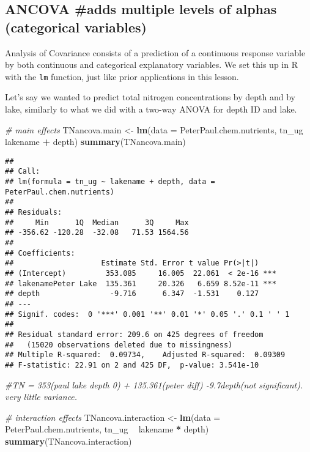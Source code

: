 \documentclass[]{article}
\newenvironment{Shaded}{\begin{snugshade}}{\end{snugshade}}
\newcommand{\KeywordTok}[1]{\textcolor[rgb]{0.13,0.29,0.53}{\textbf{#1}}}
\newcommand{\DataTypeTok}[1]{\textcolor[rgb]{0.13,0.29,0.53}{#1}}
\newcommand{\StringTok}[1]{\textcolor[rgb]{0.31,0.60,0.02}{#1}}
\newcommand{\CommentTok}[1]{\textcolor[rgb]{0.56,0.35,0.01}{\textit{#1}}}
\newcommand{\OperatorTok}[1]{\textcolor[rgb]{0.81,0.36,0.00}{\textbf{#1}}}
\newcommand{\NormalTok}[1]{#1}
\begin{document}
\subsection{ANCOVA \#adds multiple levels of alphas (categorical
variables)}\label{ancova-adds-multiple-levels-of-alphas-categorical-variables}

Analysis of Covariance consists of a prediction of a continuous response
variable by both continuous and categorical explanatory variables. We
set this up in R with the \texttt{lm} function, just like prior
applications in this lesson.

Let's say we wanted to predict total nitrogen concentrations by depth
and by lake, similarly to what we did with a two-way ANOVA for depth ID
and lake.

\begin{Shaded}
\begin{Highlighting}[]
\CommentTok{# main effects}
\NormalTok{TNancova.main <-}\StringTok{ }\KeywordTok{lm}\NormalTok{(}\DataTypeTok{data =}\NormalTok{ PeterPaul.chem.nutrients, tn_ug }\OperatorTok{~}\StringTok{ }\NormalTok{lakename }\OperatorTok{+}\StringTok{ }\NormalTok{depth)}
\KeywordTok{summary}\NormalTok{(TNancova.main) }
\end{Highlighting}
\end{Shaded}

\begin{verbatim}
## 
## Call:
## lm(formula = tn_ug ~ lakename + depth, data = PeterPaul.chem.nutrients)
## 
## Residuals:
##     Min      1Q  Median      3Q     Max 
## -356.62 -120.28  -32.08   71.53 1564.56 
## 
## Coefficients:
##                    Estimate Std. Error t value Pr(>|t|)    
## (Intercept)         353.085     16.005  22.061  < 2e-16 ***
## lakenamePeter Lake  135.361     20.326   6.659 8.52e-11 ***
## depth                -9.716      6.347  -1.531    0.127    
## ---
## Signif. codes:  0 '***' 0.001 '**' 0.01 '*' 0.05 '.' 0.1 ' ' 1
## 
## Residual standard error: 209.6 on 425 degrees of freedom
##   (15020 observations deleted due to missingness)
## Multiple R-squared:  0.09734,    Adjusted R-squared:  0.09309 
## F-statistic: 22.91 on 2 and 425 DF,  p-value: 3.541e-10
\end{verbatim}

\begin{Shaded}
\begin{Highlighting}[]
\CommentTok{#TN = 353(paul lake depth 0) + 135.361(peter diff) -9.7depth(not significant). very little variance.}

\CommentTok{# interaction effects}
\NormalTok{TNancova.interaction <-}\StringTok{ }\KeywordTok{lm}\NormalTok{(}\DataTypeTok{data =}\NormalTok{ PeterPaul.chem.nutrients, tn_ug }\OperatorTok{~}\StringTok{ }\NormalTok{lakename }\OperatorTok{*}\StringTok{ }\NormalTok{depth)}
\KeywordTok{summary}\NormalTok{(TNancova.interaction) }
\end{Highlighting}
\end{Shaded}
\end{document}
